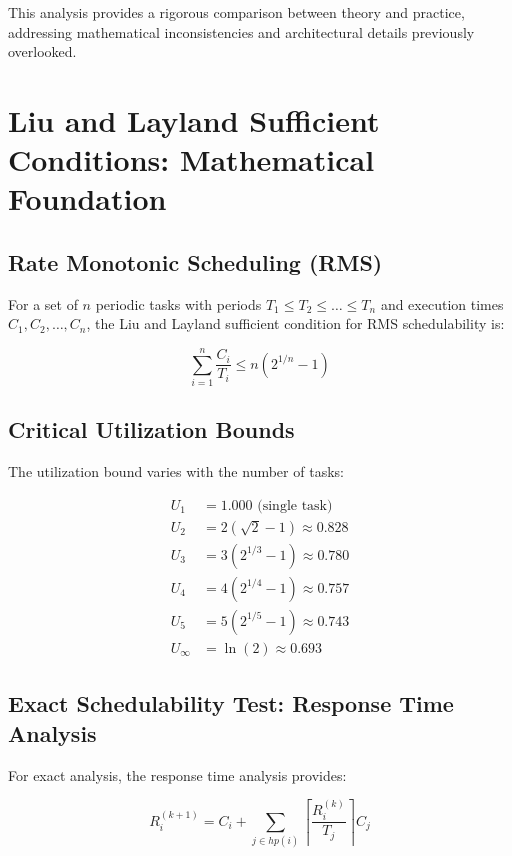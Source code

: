 \documentclass[12pt,a4paper]{article}
\begin{document}
This analysis provides a rigorous comparison between theory and practice, addressing mathematical inconsistencies and architectural details previously overlooked.

\section{Liu and Layland Sufficient Conditions: Mathematical Foundation}

\subsection{Rate Monotonic Scheduling (RMS)}

For a set of $n$ periodic tasks with periods $T_1 \leq T_2 \leq \ldots \leq T_n$ and execution times $C_1, C_2, \ldots, C_n$, the Liu and Layland sufficient condition for RMS schedulability is:

\begin{equation}
\sum_{i=1}^{n} \frac{C_i}{T_i} \leq n(2^{1/n} - 1)
\end{equation}

\subsection{Critical Utilization Bounds}

The utilization bound varies with the number of tasks:

\begin{align}
U_1 &= 1.000 \text{ (single task)} \\
U_2 &= 2(\sqrt{2} - 1) \approx 0.828 \\
U_3 &= 3(2^{1/3} - 1) \approx 0.780 \\
U_4 &= 4(2^{1/4} - 1) \approx 0.757 \\
U_5 &= 5(2^{1/5} - 1) \approx 0.743 \\
U_{\infty} &= \ln(2) \approx 0.693
\end{align}

\subsection{Exact Schedulability Test: Response Time Analysis}

For exact analysis, the response time analysis provides:

\begin{equation}
R_i^{(k+1)} = C_i + \sum_{j \in hp(i)} \left\lceil \frac{R_i^{(k)}}{T_j} \right\rceil C_j
\end{equation}
\end{document}
